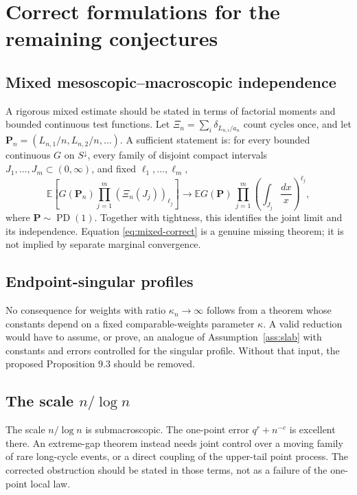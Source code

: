 \documentclass[11pt]{article}
\newcommand{\E}{\mathbb E}
\newcommand{\1}{\mathbf 1}
\newcommand{\PD}{\operatorname{PD}(1)}
\theoremstyle{remark}
\begin{document}
\section{Correct formulations for the remaining conjectures}

\subsection{Mixed mesoscopic--macroscopic independence}

A rigorous mixed estimate should be stated in terms of factorial moments and
bounded continuous test functions.  Let
$\Xi_n=\sum_i\delta_{L_{n,i}/a_n}$ count cycles once, and let
$\mathbf P_n=(L_{n,1}/n,L_{n,2}/n,\dots)$.  A sufficient statement is:
for every bounded continuous $G$ on $S^\downarrow$, every family of disjoint
compact intervals $J_1,\dots,J_m\subset(0,\infty)$, and fixed
$\ell_1,\dots,\ell_m$,
\begin{equation}\label{eq:mixed-correct}
 \E\left[G(\mathbf P_n)
       \prod_{j=1}^m(\Xi_n(J_j))_{\ell_j}\right]
 \longrightarrow
 \E G(\mathbf P)\,
 \prod_{j=1}^m\left(\int_{J_j}\frac{dx}{x}\right)^{\ell_j},
\end{equation}
where $\mathbf P\sim\PD$.  Together with tightness, this identifies the joint
limit and its independence.  Equation \eqref{eq:mixed-correct} is a genuine
missing theorem; it is not implied by separate marginal convergence.

\subsection{Endpoint-singular profiles}

No consequence for weights with ratio $\kappa_n\to\infty$ follows from a
theorem whose constants depend on a fixed comparable-weights parameter
$\kappa$.  A valid reduction would have to assume, or prove, an analogue of
Assumption~\ref{ass:slab} with constants and errors controlled for the
singular profile.  Without that input, the proposed Proposition 9.3 should be
removed.

\subsection{The scale \texorpdfstring{$n/\log n$}{n/log n}}

The scale $n/\log n$ is submacroscopic.  The one-point error
$q^r+n^{-c}$ is excellent there.  An extreme-gap theorem instead needs joint
control over a moving family of rare long-cycle events, or a direct coupling
of the upper-tail point process.  The corrected obstruction should be stated
in those terms, not as a failure of the one-point local law.
\end{document}
